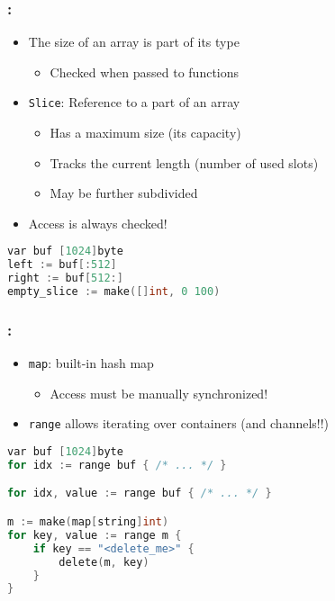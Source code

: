 \begin{frame}[fragile]
    \frametitle{\secname: \small\subsecname\normalsize}

    \begin{itemize}
        \item The size of an array is part of its type
        \begin{itemize}
            \item Checked when passed to functions
        \end{itemize}
        \item \texttt{Slice}: Reference to a part of an array
        \begin{itemize}
            \item Has a maximum size (its capacity)
            \item Tracks the current length (number of used slots)
            \item May be further subdivided
        \end{itemize}
        \item Access is always checked!
    \end{itemize}

    \small \begin{lstlisting}[language=c]
var buf [1024]byte
left := buf[:512]
right := buf[512:]
empty_slice := make([]int, 0 100)
    \end{lstlisting} \normalsize
\end{frame}

\begin{frame}[fragile]
    \frametitle{\secname: \small\subsecname\normalsize}

    \begin{itemize}
        \item \texttt{map}: built-in hash map
        \begin{itemize}
            \item Access must be manually synchronized!
        \end{itemize}
        \item \texttt{range} allows iterating over containers (and channels!!)
    \end{itemize}

    \small \begin{lstlisting}[language=c]
var buf [1024]byte
for idx := range buf { /* ... */ }

for idx, value := range buf { /* ... */ }

m := make(map[string]int)
for key, value := range m {
    if key == "<delete_me>" {
        delete(m, key)
    }
}
    \end{lstlisting} \normalsize
\end{frame}

